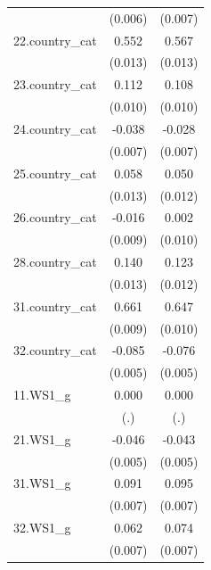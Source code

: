 \begin{table}[htbp]
\begin{tabular}{l cc}
            &     (0.006)         &     (0.007)         \\
\addlinespace
22.country\_cat&       0.552\sym{***}&       0.567\sym{***}\\
            &     (0.013)         &     (0.013)         \\
\addlinespace
23.country\_cat&       0.112\sym{***}&       0.108\sym{***}\\
            &     (0.010)         &     (0.010)         \\
\addlinespace
24.country\_cat&      -0.038\sym{***}&      -0.028\sym{***}\\
            &     (0.007)         &     (0.007)         \\
\addlinespace
25.country\_cat&       0.058\sym{***}&       0.050\sym{***}\\
            &     (0.013)         &     (0.012)         \\
\addlinespace
26.country\_cat&      -0.016\sym{*}  &       0.002         \\
            &     (0.009)         &     (0.010)         \\
\addlinespace
28.country\_cat&       0.140\sym{***}&       0.123\sym{***}\\
            &     (0.013)         &     (0.012)         \\
\addlinespace
31.country\_cat&       0.661\sym{***}&       0.647\sym{***}\\
            &     (0.009)         &     (0.010)         \\
\addlinespace
32.country\_cat&      -0.085\sym{***}&      -0.076\sym{***}\\
            &     (0.005)         &     (0.005)         \\
\addlinespace
11.WS1\_g    &       0.000         &       0.000         \\
            &         (.)         &         (.)         \\
\addlinespace
21.WS1\_g    &      -0.046\sym{***}&      -0.043\sym{***}\\
            &     (0.005)         &     (0.005)         \\
\addlinespace
31.WS1\_g    &       0.091\sym{***}&       0.095\sym{***}\\
            &     (0.007)         &     (0.007)         \\
\addlinespace
32.WS1\_g    &       0.062\sym{***}&       0.074\sym{***}\\
            &     (0.007)         &     (0.007)         \\

\end{tabular}
\end{table}
